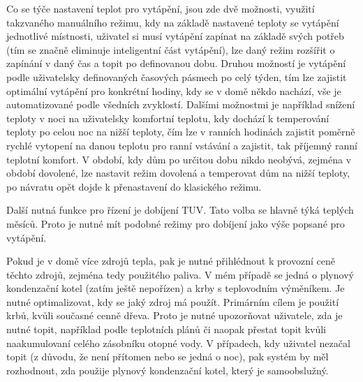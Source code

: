 Co se týče nastavení teplot pro vytápění, jsou zde dvě možnosti, využití takzvaného manuálního režimu, kdy na základě nastavené teploty se vytápění jednotlivé místnosti, uživatel si musí vytápění zapínat na základě svých potřeb (tím se značně eliminuje inteligentní část vytápění), lze daný režim rozšířit o zapínání  v daný čas a topit po definovanou dobu. Druhou možností je vytápění podle uživatelsky definovaných časových pásmech po celý týden, tím lze zajistit optimální vytápění pro konkrétní hodiny, kdy se v domě někdo nachází, vše je automatizované podle všedních zvyklostí. Dalšími možnostmi je například snížení teploty v noci na uživatelsky komfortní teplotu, kdy dochází k temperování teploty po celou noc na nižší teploty, čím lze v ranních hodinách  zajistit poměrně rychlé vytopení na danou teplotu pro ranní vstávání a zajistit, tak příjemný ranní teplotní komfort. V období, kdy dům po určitou dobu nikdo neobývá, zejména v období dovolené, lze nastavit režim dovolená a temperovat dům na nižší teploty, po návratu opět dojde k přenastavení do klasického režimu. 

Další nutná funkce pro řízení je dobíjení TUV. Tato volba se hlavně týká teplých měsíců. Proto je nutné mít podobné režimy pro dobíjení jako výše popsané pro vytápění.

Pokud je v domě více zdrojů tepla, pak je nutné přihlédnout k provozní ceně těchto zdrojů, zejména tedy použitého paliva. V mém případě se jedná o plynový kondenzační kotel (zatím ještě nepořízen) a krby s teplovodním výměníkem. Je nutné optimalizovat, kdy se jaký zdroj má použít. Primárním cílem je použití krbů, kvůli současné cenně dřeva. Proto je nutné upozorňovat uživatele, zda je nutné topit, například podle teplotních plánů či naopak přestat topit kvůli naakumulovaní celého zásobníku otopné vody. V případech, kdy uživatel nezačal topit (z důvodu, že není přítomen nebo se jedná o noc), pak systém by měl rozhodnout, zda použije plynový kondenzační kotel, který je samoobslužný.

